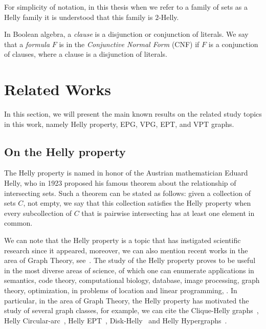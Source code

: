 For simplicity of notation, in this thesis when we refer to a family of sets as a Helly family it is understood that this family is $ 2$-Helly.

In Boolean algebra, a \emph{clause} is a disjunction or conjunction of literals. We say that a \emph{formula} $ F $ is in the \emph{Conjunctive Normal Form} (CNF) if $ F $ is a conjunction of clauses, where a clause is a disjunction of literals.

\section{Related Works}

In this section, we will present the main known results on the related study topics in this work, namely Helly property, EPG, VPG, EPT, and VPT graphs.

\subsection{On the Helly property}


The Helly property is named in honor of the Austrian mathematician Eduard Helly, who in 1923 proposed his famous theorem about the relationship of intersecting sets. Such a theorem can be  stated as follows: given a collection of  sets $ C$, not empty, we say that this collection satisfies the Helly property when every subcollection of $C$ that is pairwise intersecting has at least one element in common.


We can note that the Helly property is a topic that has instigated scientific research since it appeared, moreover, we can also mention recent works in the area of Graph Theory, see~\cite{berge1973, bergeDuchet1975, DOURADO2008, golumbic2013, dourado2006computational, teles2016, jose2018}.
The study of the Helly property proves to be useful in the most diverse areas of science, of which one can enumerate applications in semantics, code theory, computational biology, database, image processing, graph theory, optimization, in problems of location and linear programming, \cite{teles2016}. In particular, in the area of Graph Theory, the Helly property has motivated the study of several graph classes, for example, we can cite the  Clique-Helly graphs~\cite{DOURADO2008}, Helly Circular-arc~\cite{safe2016essential}, Helly EPT~\cite{alcon2017helly}, Disk-Helly~\cite{lin2007faster} and Helly Hypergraphs~\cite{mulder1979median}.


